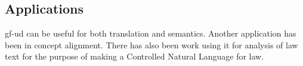 \documentclass{article}
\begin{document}





\subsection{Applications}


 gf-ud can be useful for both translation and semantics\cite{ranta2020abstract}. Another application has been in concept alignment\cite{masciolini2021grammar}.
 There has also been work using it for analysis of law text for the purpose of making a Controlled Natural Language for law\cite{listenmaa-etal-2021-towards}.


\end{document}
